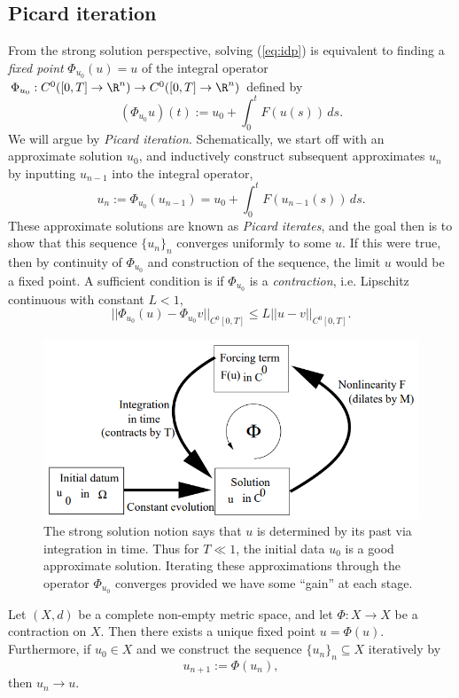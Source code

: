 \subsection{Picard iteration}

	From the strong solution perspective, solving (\ref{eq:idp}) is equivalent to finding a \emph{fixed point} $\Phi_{u_0} (u) = u$ of the integral operator $\Phi_{u_0} : C^0 ([0, T] \to \R^n) \to C^0 ([0, T] \to \R^n)$ defined by 
		\[ (\Phi_{u_0} u)(t) := u_0 + \int_0^t F(u(s)) \, ds. \]
	We will argue by \textit{Picard iteration}. Schematically, we start off with an approximate solution $u_0$, and inductively construct subsequent approximates $u_{n}$ by inputting $u_{n - 1}$ into the integral operator,
		\[ u_n := \Phi_{u_0} (u_{n - 1}) = u_0 + \int_0^t F(u_{n - 1}(s)) \, ds .\]
	These approximate solutions are known as \emph{Picard iterates}, and the goal then is to show that this sequence $\{u_n\}_n$ converges uniformly to some $u$. If this were true, then by continuity of $\Phi_{u_0}$ and construction of the sequence, the limit $u$ would be a fixed point. A sufficient condition is if $\Phi_{u_0}$ is a \emph{contraction}, i.e. Lipschitz continuous with constant $L < 1$, 
	\[ || \Phi_{u_0} (u) - \Phi_{u_0} v||_{C^0[0, T]} \leq L ||u - v||_{C^0[0, T]}. \]
	\begin{figure}[h]
		\begin{center}
			\includegraphics[scale = 0.6]{picard}
			\caption{The strong solution notion says that $u$ is determined by its past via integration in time. Thus for $T \ll 1$, the initial data $u_0$ is a good approximate solution. Iterating these approximations through the operator $\Phi_{u_0}$ converges provided we have some ``gain'' at each stage. }
		\end{center}
	\end{figure}
	
\begin{lemma}
	Let $(X, d)$ be a complete non-empty metric space, and let $\Phi : X \to X$ be a contraction on $X$. Then there exists a unique fixed point $u = \Phi(u)$. Furthermore, if $u_0 \in X$ and we construct the sequence $\{u_n\}_n \subseteq X$ iteratively by 
		\[ u_{n + 1} := \Phi(u_n),\]
	then $u_n \to u$. 
\end{lemma}

